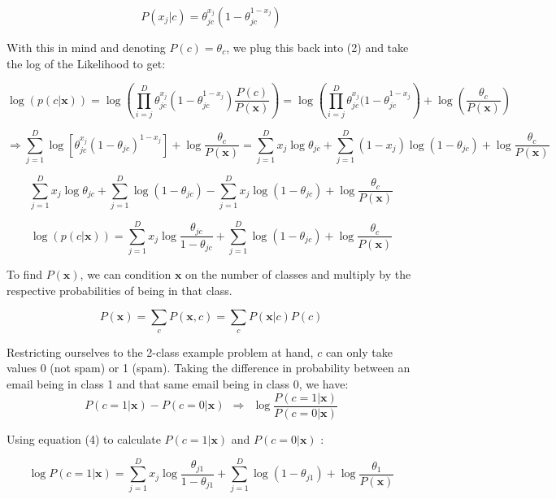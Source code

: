 \begin{equation}
P(x_j | c ) = \theta_{jc}^{x_j} (1 - \theta_{jc}^{1 - x_j})
\end{equation}

With this in mind and denoting $P(c) = \theta_c$, we plug this back into (2) and take the log of the Likelihood to get: 

$$
\log(p(c | \mathbf{x})) = \log \left ( \prod_{i=j}^D \theta_{jc}^{x_j} (1 - \theta_{jc}^{1 - x_j})  \frac{P(c)}{P(\mathbf{x})} \right) = \log \left ( \prod_{i=j}^D \theta_{jc}^{x_j} (1 - \theta_{jc}^{1 - x_j} \right) + \log \left( \frac{\theta_c}{P(\mathbf{x})} \right)
$$

$$
\Rightarrow \sum_{j=1}^D \log[ \theta_{jc}^{x_j} (1 - \theta_{jc})^{1-x_j}] + \log \frac{\theta_c}{P(\mathbf{x})} = \sum_{j=1}^D x_j \log \theta_{jc} + \sum_{j=1}^D (1-x_j) \log(1 - \theta_{jc}) + \log \frac{\theta_c}{P(\mathbf{x})}
$$

$$
\sum_{j=1}^D x_j \log \theta_{jc} + \sum_{j=1}^D \log(1 - \theta_{jc}) - \sum_{j=1}^D x_j \log(1 - \theta_{jc}) + \log \frac{\theta_c}{P(\mathbf{x})}
$$

\begin{equation}
\log(p(c | \mathbf{x})) = \sum_{j=1}^D x_j \log \frac{ \theta_{jc}}{1 - \theta_{jc}} + \sum_{j=1}^D \log(1 - \theta_{jc}) +  \log \frac{\theta_c}{P(\mathbf{x})} 
\end{equation}

To find $P(\mathbf{x})$, we can condition $\mathbf{x}$ on the number of classes and multiply by the respective probabilities of being in that class.  

$$
P(\mathbf{x}) = \sum_c P(\mathbf{x}, c) = \sum_c P(\mathbf{x} | c) P(c)
$$

Restricting ourselves to the 2-class example problem at hand, $c$ can only take values 0 (not spam) or 1 (spam).  Taking the difference in probability between an email being in class 1 and that same email being in class 0, we have: 
\begin{equation}
P( c = 1 | \mathbf{x}) - P( c = 0 | \mathbf{x}) ~~ \Rightarrow ~~ 
\log \frac{  P( c = 1 | \mathbf{x})}{P( c = 0 | \mathbf{x})}
\end{equation}

Using equation (4) to calculate $P(c = 1 | \mathbf{x}) $ and $P(c = 0 | \mathbf{x}) $ :

\begin{equation}
\log P(c = 1 | \mathbf{x}) = \sum_{j=1}^D x_j \log \frac{ \theta_{j1}}{1 - \theta_{j1}} + \sum_{j=1}^D \log(1 - \theta_{j1}) +  \log \frac{\theta_1}{P(\mathbf{x})} 
\end{equation}

